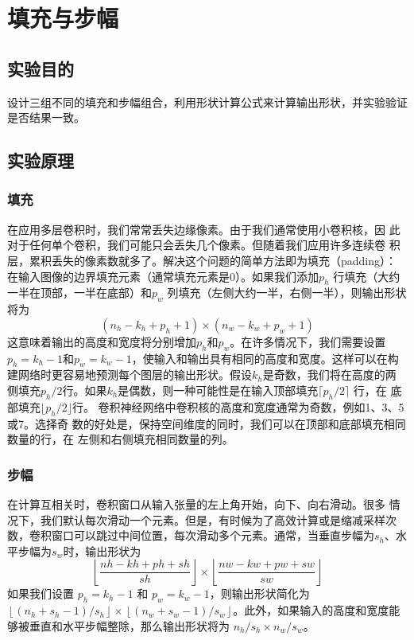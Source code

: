 \documentclass[a4paper,12pt]{article}
\begin{document}
\newpage
\section{填充与步幅}
\subsection{实验目的}
设计三组不同的填充和步幅组合，利用形状计算公式来计算输出形状，并实验验证是否结果一致。

\subsection{实验原理}
\subsubsection{填充}
在应用多层卷积时，我们常常丢失边缘像素。由于我们通常使用小卷积核，因
此对于任何单个卷积，我们可能只会丢失几个像素。但随着我们应用许多连续卷
积层，累积丢失的像素数就多了。解决这个问题的简单方法即为填充（padding）：
在输入图像的边界填充元素（通常填充元素是0）。如果我们添加$p_h$ 行填充（大约
一半在顶部，一半在底部）和$p_w$ 列填充（左侧大约一半，右侧一半），则输出形状
将为
\begin{equation}
(n_h - k_h + p_h + 1) \times (n_w - k_w + p_w + 1)
\end{equation}
这意味着输出的高度和宽度将分别增加$p_h $和$p_w$。在许多情况下，我们需要设置
$p_h = k_h − 1$和$p_w = k_w − 1$，使输入和输出具有相同的高度和宽度。这样可以在构
建网络时更容易地预测每个图层的输出形状。假设$k_h$是奇数，我们将在高度的两
侧填充$p_h/2$行。如果$k_h$是偶数，则一种可能性是在输入顶部填充$\lceil p_h/2 \rceil$ 行，在
底部填充$\lfloor p_h/2 \rfloor$行。
卷积神经网络中卷积核的高度和宽度通常为奇数，例如1、3、5 或7。选择奇
数的好处是，保持空间维度的同时，我们可以在顶部和底部填充相同数量的行，在
左侧和右侧填充相同数量的列。

\subsubsection{步幅}
在计算互相关时，卷积窗口从输入张量的左上角开始，向下、向右滑动。很多
情况下，我们默认每次滑动一个元素。但是，有时候为了高效计算或是缩减采样次
数，卷积窗口可以跳过中间位置，每次滑动多个元素。通常，当垂直步幅为$s_h$、水
平步幅为$s_w$时，输出形状为
\begin{equation}
\left\lfloor \frac{nh - kh + ph + sh}{sh} \right\rfloor \times \left\lfloor \frac{nw - kw + pw + sw}{sw} \right\rfloor
\end{equation}
如果我们设置 \( p_h = k_h - 1 \) 和 \( p_w = k_w - 1 \)，则输出形状简化为 \( \left\lfloor (n_h + s_h - 1)/s_h \right\rfloor \times \left\lfloor (n_w + s_w - 1)/s_w \right\rfloor \)。此外，如果输入的高度和宽度能够被垂直和水平步幅整除，那么输出形状将为 \( n_h/s_h \times n_w/s_w \)。
\end{document}
